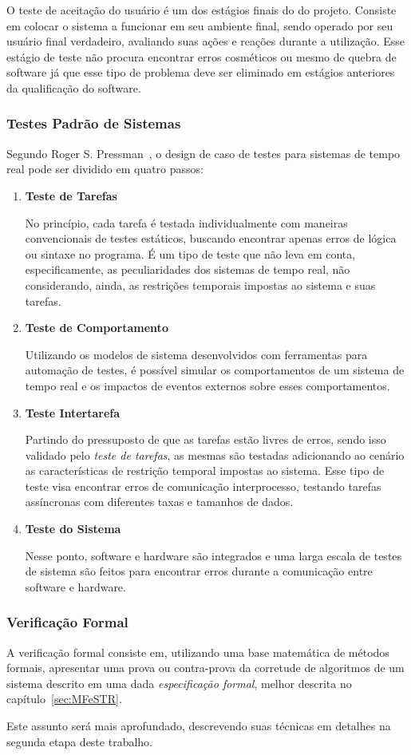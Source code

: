 O teste de aceitação do usuário é um dos estágios finais do do projeto. Consiste em colocar o sistema a funcionar em seu ambiente final,
sendo operado por seu usuário final verdadeiro, avaliando suas ações e reações durante a utilização. Esse estágio de teste
não procura encontrar erros cosméticos ou mesmo de quebra de software já que esse tipo de problema deve ser eliminado em
estágios anteriores da qualificação do software.

\subsubsection{Testes Padrão de Sistemas}
Segundo Roger S. Pressman~\cite{pre_2005}, o design de caso de testes para sistemas de tempo real pode ser dividido
em quatro passos:

\begin{enumerate}
\item \textbf{Teste de Tarefas}

No princípio, cada tarefa é testada individualmente com maneiras convencionais de testes estáticos, buscando encontrar
apenas erros de lógica ou sintaxe no programa. É um tipo de teste que não leva em conta, especificamente, as peculiaridades
dos sistemas de tempo real, não considerando, ainda, as restrições temporais impostas ao sistema e suas tarefas.


\item \textbf{Teste de Comportamento}

Utilizando os modelos de sistema desenvolvidos com ferramentas para automação de testes, é possível simular os comportamentos
de um sistema de tempo real e os impactos de eventos externos sobre esses comportamentos.


\item \textbf{Teste Intertarefa}

Partindo do pressuposto de que as tarefas estão livres de erros, sendo isso validado pelo \textit{teste de tarefas}, as mesmas são
testadas adicionando ao cenário as características de restrição temporal impostas ao sistema. Esse tipo de teste visa encontrar
erros de comunicação interprocesso, testando tarefas assíncronas com diferentes taxas e tamanhos de dados.


\item \textbf{Teste do Sistema}

Nesse ponto, software e hardware são integrados e uma larga escala de testes de sistema são feitos para encontrar erros durante
a comunicação entre software e hardware.

\end{enumerate}

\subsubsection{Verificação Formal}
A verificação formal consiste em, utilizando uma base matemática de métodos formais, apresentar uma prova ou
contra-prova da corretude de algoritmos de um sistema descrito em uma dada \textit{especificação formal}, melhor
descrita no capítulo~\ref{sec:MFeSTR}.

Este assunto será mais aprofundado, descrevendo suas técnicas em detalhes na segunda etapa deste trabalho.

